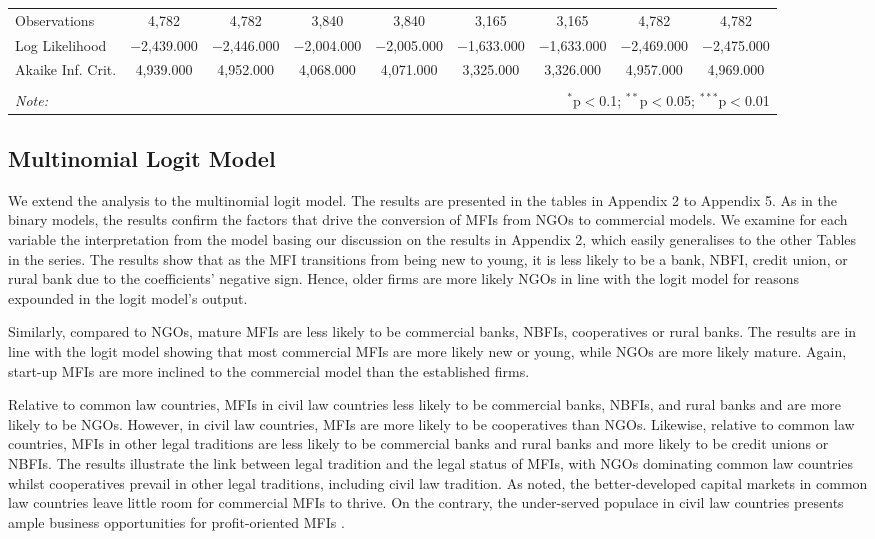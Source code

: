 \documentclass[a4paper,nobind]{templates/ociamthesis}
\begin{document}
\begin{table}[!htbp]
\begin{tabular}{@{\extracolsep{5pt}}lcccccccc}
Observations & 4,782 & 4,782 & 3,840 & 3,840 & 3,165 & 3,165 & 4,782 & 4,782 \\ 
Log Likelihood & $-$2,439.000 & $-$2,446.000 & $-$2,004.000 & $-$2,005.000 & $-$1,633.000 & $-$1,633.000 & $-$2,469.000 & $-$2,475.000 \\ 
Akaike Inf. Crit. & 4,939.000 & 4,952.000 & 4,068.000 & 4,071.000 & 3,325.000 & 3,326.000 & 4,957.000 & 4,969.000 \\ 
\hline 
\hline \\[-1.8ex] 
\textit{Note:}  & \multicolumn{8}{r}{$^{*}$p$<$0.1; $^{**}$p$<$0.05; $^{***}$p$<$0.01} \\ 
\end{tabular} 
\end{table}

\elandscape

\newpage

\hypertarget{multinomial-logit-model}{%
\subsection{Multinomial Logit Model}\label{multinomial-logit-model}}

We extend the analysis to the multinomial logit model. The results are presented in the tables in Appendix 2 to Appendix 5. As in the binary models, the results confirm the factors that drive the conversion of MFIs from NGOs to commercial models. We examine for each variable the interpretation from the model basing our discussion on the results in Appendix 2, which easily generalises to the other Tables in the series. The results show that as the MFI transitions from being new to young, it is less likely to be a bank, NBFI, credit union, or rural bank due to the coefficients' negative sign. Hence, older firms are more likely NGOs in line with the logit model for reasons expounded in the logit model's output.

Similarly, compared to NGOs, mature MFIs are less likely to be commercial banks, NBFIs, cooperatives or rural banks. The results are in line with the logit model showing that most commercial MFIs are more likely new or young, while NGOs are more likely mature. Again, start-up MFIs are more inclined to the commercial model than the established firms.

Relative to common law countries, MFIs in civil law countries less likely to be commercial banks, NBFIs, and rural banks and are more likely to be NGOs. However, in civil law countries, MFIs are more likely to be cooperatives than NGOs. Likewise, relative to common law countries, MFIs in other legal traditions are less likely to be commercial banks and rural banks and more likely to be credit unions or NBFIs. The results illustrate the link between legal tradition and the legal status of MFIs, with NGOs dominating common law countries whilst cooperatives prevail in other legal traditions, including civil law tradition. As noted, the better-developed capital markets in common law countries leave little room for commercial MFIs to thrive. On the contrary, the under-served populace in civil law countries presents ample business opportunities for profit-oriented MFIs \autocite{d2013unsubsidized,mia2017mission}.
\end{document}
